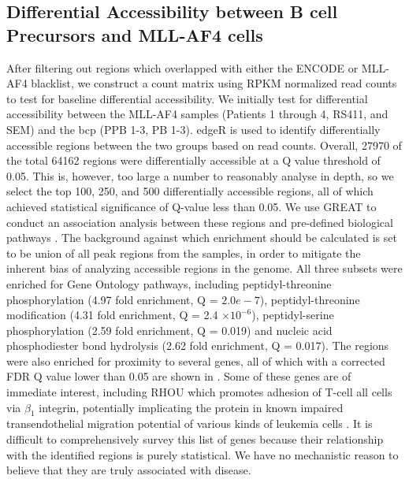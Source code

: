 \subsection{Differential Accessibility between B cell Precursors and MLL-AF4 cells} \label{ch5:mll_diffacc}

After filtering out regions which overlapped with either the ENCODE or MLL-AF4 blacklist, we construct a count matrix using RPKM normalized read counts to test for baseline differential accessibility. We initially test for differential accessibility between the MLL-AF4 samples (Patients 1 through 4, RS411, and SEM) and the \gls{bcp} (PPB 1-3, PB 1-3). edgeR is used to identify differentially accessible regions between the two groups based on read counts. Overall, 27970 of the total 64162 regions were differentially accessible at a Q value threshold of 0.05. This is, however, too large a number to reasonably analyse in depth, so we select the top 100, 250, and 500 differentially accessible regions, all of which achieved statistical significance of Q-value less than 0.05. We use GREAT to conduct an association analysis between these regions and pre-defined biological pathways \cite{CY2010}. The background against which enrichment should be calculated is set to be union of all peak regions from the samples, in order to mitigate the inherent bias of analyzing accessible regions in the genome. All three subsets were enriched for Gene Ontology pathways, including peptidyl-threonine phosphorylation (4.97 fold enrichment, Q = $2.0e-7$), peptidyl-threonine modification (4.31 fold enrichment, Q = 2.4 $\times 10^{-6}$), peptidyl-serine phosphorylation (2.59 fold enrichment, Q = 0.019) and nucleic acid phosphodiester bond hydrolysis (2.62 fold enrichment, Q = 0.017). The regions were also enriched for proximity to several genes, all of which with a corrected FDR Q value lower than 0.05 are shown in .  Some of these genes are of immediate interest, including RHOU which promotes adhesion of T-cell \gls{all} cells via $\beta_1$ integrin, potentially implicating the protein in known impaired transendothelial migration potential of various kinds of leukemia cells \cite{Trinidad2009, Infante2013}. It is difficult to comprehensively survey this list of genes because their relationship with the identified regions is purely statistical. We have no mechanistic reason to believe that they are truly associated with disease. 

